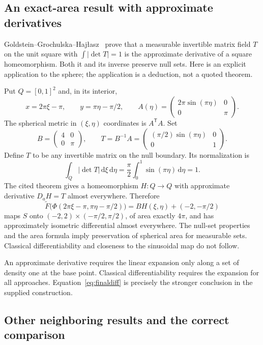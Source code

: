 \documentclass[11pt,letterpaper]{article}
\numberwithin{equation}{section}
\theoremstyle{remark}
\newcommand{\dd}{\,\mathrm d}
\begin{document}
\subsection{An exact-area result with approximate derivatives}

Goldstein--Grochulska--Haj\l asz~\cite[Theorem 1.4]{ggh} prove that a measurable invertible matrix field $T$ on the unit square with $\int|\det T|=1$ is the approximate derivative of a square homeomorphism. Both it and its inverse preserve null sets. Here is an explicit application to the sphere; the application is a deduction, not a quoted theorem.

Put $Q=[0,1]^2$ and, in its interior,
\[
 x=2\pi\xi-\pi,\qquad y=\pi\eta-\pi/2,
 \qquad
 A(\eta)=\begin{pmatrix}2\pi\sin(\pi\eta)&0\\0&\pi\end{pmatrix}.
\]
The spherical metric in $(\xi,\eta)$ coordinates is $A^{\mathsf T}A$. Set
\[
 B=\begin{pmatrix}4&0\\0&\pi\end{pmatrix},\qquad
 T=B^{-1}A=\begin{pmatrix}(\pi/2)\sin(\pi\eta)&0\\0&1\end{pmatrix}.
\]
Define $T$ to be any invertible matrix on the null boundary. Its normalization is
\[
 \int_Q|\det T|\dd\xi\dd\eta
 =\frac\pi2\int_0^1\sin(\pi\eta)\dd\eta=1.
\]
The cited theorem gives a homeomorphism $H:Q\to Q$ with approximate derivative $D_{\!a}H=T$ almost everywhere. Therefore
\[
 \widetilde F\bigl(\Phi(2\pi\xi-\pi,\pi\eta-\pi/2)\bigr)
 =BH(\xi,\eta)+(-2,-\pi/2)
\]
maps $S$ onto $(-2,2)\times(-\pi/2,\pi/2)$, of area exactly $4\pi$, and has approximately isometric differential almost everywhere. The null-set properties and the area formula imply preservation of spherical area for measurable sets. Classical differentiability and closeness to the sinusoidal map do not follow.

An approximate derivative requires the linear expansion only along a set of density one at the base point. Classical differentiability requires the expansion for all approaches. Equation~\eqref{eq:finaldiff} is precisely the stronger conclusion in the supplied construction.

\subsection{Other neighboring results and the correct comparison}
\end{document}

